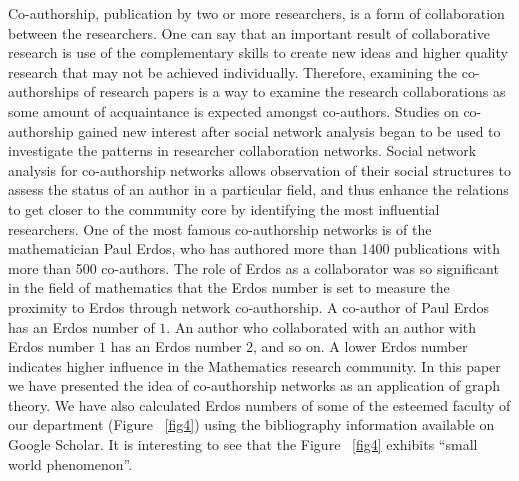 \documentclass[12pt]{article}
\theoremstyle{definition}
\begin{document}
Co-authorship, publication by two or more researchers, is a form of collaboration between the researchers. One can say that an important result of collaborative research is use of the complementary skills to create new ideas and higher quality research that may not be achieved individually. Therefore, examining the co-authorships of research papers is a way to examine the research collaborations as some amount of acquaintance is expected amongst co-authors. 
Studies on co-authorship gained new interest after social network analysis began to be used to investigate the patterns in researcher collaboration networks. Social network analysis for co-authorship networks allows observation of their social structures to assess the status of an author in a particular field, and thus enhance the relations to get closer to the community core by identifying the most influential researchers.
One of the most famous co-authorship networks is of the mathematician Paul Erdos, who has authored more than 1400 publications with more than 500 co-authors. The role of Erdos as a collaborator was so significant in the field of mathematics that the Erdos number is set to measure the proximity to Erdos through network co-authorship. A co-author of Paul Erdos has an Erdos number of $1$. An author who collaborated with an author with Erdos number $1$ has an Erdos number $2$, and so on. A lower Erdos number indicates higher influence in the Mathematics research community. 
In this paper we have presented the idea of co-authorship networks as an application of graph theory. We have also calculated Erdos numbers of some of the esteemed faculty of our department (Figure ~\ref{fig4}) using the bibliography information available on Google Scholar. It is interesting to see that the Figure ~\ref{fig4} exhibits “small world phenomenon”.



\end{document}
